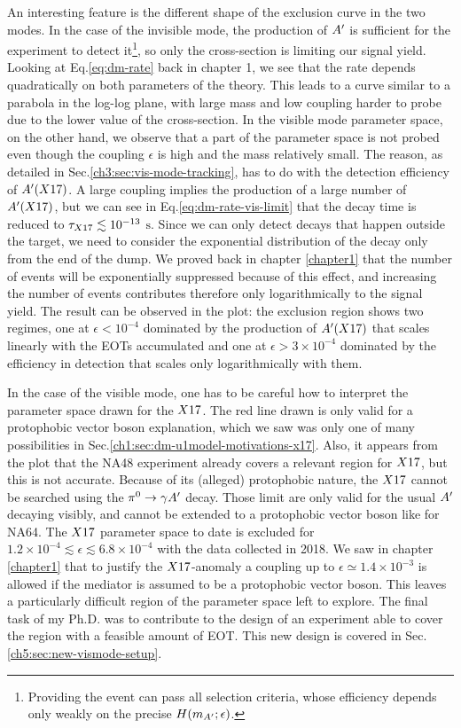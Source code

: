 An interesting feature is the different shape of the exclusion curve in the two modes. In the case of the invisible mode, the production of $A'$ is sufficient for the experiment to detect it\footnote{Providing the event can pass all selection criteria, whose efficiency depends only weakly on the precise $H(m_{A'};\epsilon)$.}, so only the cross-section is limiting our signal yield. Looking at Eq.\ref{eq:dm-rate} back in chapter 1, we see that the rate depends quadratically on both parameters of the theory. This leads to a curve similar to a parabola in the log-log plane, with large mass and low coupling harder to probe due to the lower value of the cross-section. In the visible mode parameter space, on the other hand, we observe that a part of the parameter space is not probed even though the coupling $\epsilon$ is high and the mass relatively small. The reason, as detailed in Sec.\ref{ch3:sec:vis-mode-tracking}, has to do with the detection efficiency of $A'(X17)$. A large coupling implies the production of a large number of $A'(X17)$, but we can see in Eq.\ref{eq:dm-rate-vis-limit} that the decay time is reduced to $\tau_{X17} \lesssim 10^{-13}$ $\si{\second}$. Since we can only detect decays that happen outside the target, we need to consider the exponential distribution of the decay only from the end of the dump. We proved back in chapter \ref{chapter1} that the number of events will be exponentially suppressed because of this effect, and increasing the number of events contributes therefore only logarithmically to the signal yield. The result can be observed in the plot: the exclusion region shows two regimes, one at $\epsilon < 10^{-4}$ dominated by the production of $A'(X17)$ that scales linearly with the EOTs accumulated and one at $\epsilon > 3 \times 10^{-4}$ dominated by the efficiency in detection that scales only logarithmically with them.

In the case of the visible mode, one has to be careful how to interpret the parameter space drawn for the $X17$. The red line drawn is only valid for a protophobic vector boson explanation, which we saw was only one of many possibilities in Sec.\ref{ch1:sec:dm-u1model-motivations-x17}. Also, it appears from the plot that the NA48 experiment already covers a relevant region for $X17$, but this is not accurate. Because of its (alleged) protophobic nature, the $X17$ cannot be searched using the $\pi^0 \rightarrow \gamma A'$ decay. Those limit are only valid for the usual $A'$ decaying visibly, and cannot be extended to a protophobic vector boson like for NA64. The $X17$ parameter space to date is excluded for $1.2 \times 10^{-4} \lesssim \epsilon \lesssim 6.8 \times 10^{-4}$ with the data collected in 2018. We saw in chapter \ref{chapter1} that to justify the $X17$-anomaly a coupling up to $\epsilon \simeq 1.4 \times 10^{-3}$ is allowed if the mediator is assumed to be a protophobic vector boson. This leaves a particularly difficult region of the parameter space left to explore. The final task of my Ph.D. was to contribute to the design of an experiment able to cover the region with a feasible amount of EOT. This new design is covered in Sec.\ref{ch5:sec:new-vismode-setup}.

